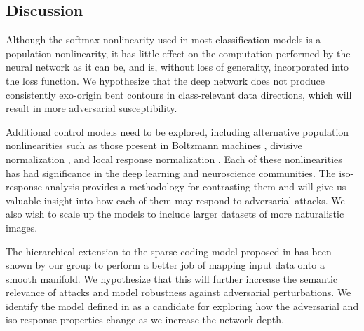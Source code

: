 



\subsection{Discussion}
Although the softmax nonlinearity used in most classification models is a population nonlinearity, it has little effect on the computation performed by the neural network as it can be, and is, without loss of generality, incorporated into the loss function. We hypothesize that the deep network does not produce consistently exo-origin bent contours in class-relevant data directions, which will result in more adversarial susceptibility.

Additional control models need to be explored, including alternative population nonlinearities such as those present in Boltzmann machines \parencite{salakhutdinov2009deep}, divisive normalization \parencite{balle2016end}, and local response normalization \parencite{krizhevsky2012imagenet}. Each of these nonlinearities has had significance in the deep learning and neuroscience communities. The iso-response analysis provides a methodology for contrasting them and will give us valuable insight into how each of them may respond to adversarial attacks. We also wish to scale up the models to include larger datasets of more naturalistic images. 

The hierarchical extension to the sparse coding model proposed in \parencite{chen2018sparse} has been shown by our group to perform a better job of mapping input data onto a smooth manifold. We hypothesize that this will further increase the semantic relevance of attacks and model robustness against adversarial perturbations. We identify the model defined in \parencite{chen2018sparse} as a candidate for exploring how the adversarial and iso-response properties change as we increase the network depth.


